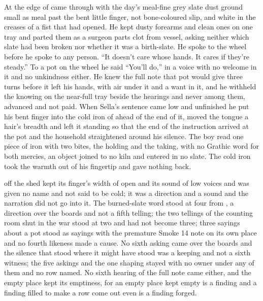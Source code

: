 At the edge of   came through with the day's meal-fine grey slate dust ground small as meal past the bent little finger, not bone-coloured slip, and white in the creases of a fist that had opened. He kept dusty forearms and clean ones on one tray and parted them as a surgeon parts clot from vessel, asking neither which slate had been broken nor whether it was a birth-slate. He spoke to the wheel before he spoke to any person. “It doesn't care whose hands. It cares if they're steady.” To a pot on the wheel he said “You'll do,” in a voice with no welcome in it and no unkindness either. He knew the full note that pot would give three turns before it left his hands, with air under it and a want in it, and he withheld the knowing on the near-full tray beside the hearings and never among them, advanced and not paid. When Sella's sentence came low and unfinished he put his bent finger into the cold iron of  ahead of the end of it, moved the tongue a hair's breadth and left it standing so that the end of the instruction arrived at the pot and the household straightened around his silence. The boy read one piece of iron with two bites, the holding and the taking, with no Grathic word for both mercies, an object joined to no kiln and entered in no slate. The cold iron took the warmth out of his fingertip and gave nothing back.

 off the shed kept its finger's width of open and its sound of low voices and was given no name and not said to be cold; it was a direction and a sound and the narration did not go into it. The burned-slate word stood at four from , a direction over the boards and not a fifth telling; the two tellings of the counting room shut in the war stood at two and had not become three; three sayings about a pot stood as sayings with the premature Smoke 14 note on its own place and no fourth likeness made a cause. No sixth asking came over the boards and the silence that stood where it might have stood was a keeping and not a sixth witness; the five askings and the one shaping stayed with no owner under any of them and no row named. No sixth hearing of the full note came either, and the empty place kept its emptiness, for an empty place kept empty is a finding and a finding filled to make a row come out even is a finding forged.

